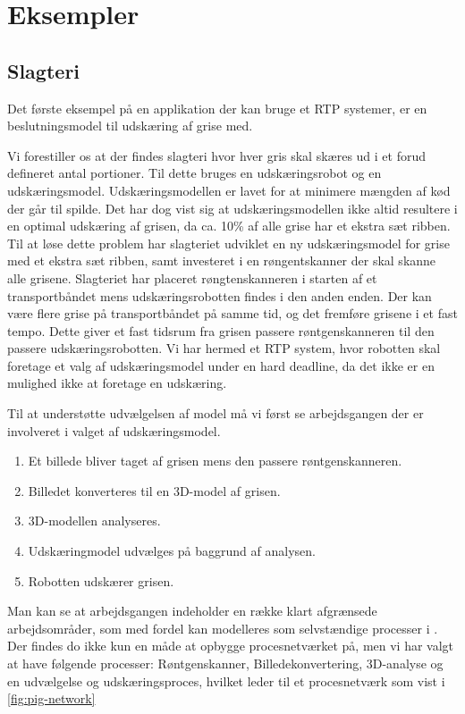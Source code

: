 \section{Eksempler}
\subsection{Slagteri}

Det første eksempel på en applikation der kan bruge et RTP systemer, er en beslutningsmodel til udskæring af grise med.

Vi forestiller os at der findes slagteri hvor  hver gris skal skæres ud i et forud defineret antal portioner. Til dette bruges en udskæringsrobot og en udskæringsmodel. Udskæringsmodellen er lavet for at minimere mængden af kød der går til spilde.  Det har dog vist sig at udskæringsmodellen ikke altid resultere i en  optimal udskæring af grisen, da  ca. 10\% af alle grise har et ekstra sæt ribben. Til at løse dette problem har slagteriet udviklet en ny udskæringsmodel for grise med et ekstra sæt ribben, samt  investeret i en røngentskanner der skal skanne alle grisene. 
Slagteriet har placeret røngtenskanneren i starten af et transportbåndet mens udskæringsrobotten findes i den anden enden. Der kan være flere grise på transportbåndet på samme tid, og det fremføre grisene i et fast tempo. Dette giver et fast tidsrum fra grisen passere røntgenskanneren til den passere udskæringsrobotten. Vi har hermed et RTP system, hvor robotten skal foretage et valg af udskæringsmodel under en hard deadline, da det ikke er en mulighed ikke at foretage en udskæring.

Til at understøtte udvælgelsen af model må vi først se arbejdsgangen der er involveret i valget af udskæringsmodel. 
\begin{enumerate}
\tightlist
	\item Et billede bliver taget af grisen mens den passere røntgenskanneren.
	\item Billedet konverteres til en 3D-model af grisen.
	\item 3D-modellen analyseres.
	\item Udskæringmodel udvælges på baggrund af analysen.
	\item Robotten udskærer grisen.
\end{enumerate}

Man kan se at arbejdsgangen indeholder en  række klart afgrænsede arbejdsområder, som med fordel kan modelleres som selvstændige processer i \pycsp. Der findes do ikke kun en måde at opbygge procesnetværket på, men vi har valgt at have følgende processer: Røntgenskanner, Billedekonvertering, 3D-analyse og en udvælgelse og udskæringsproces, hvilket leder til et procesnetværk som vist i \cref{fig:pig-network}

